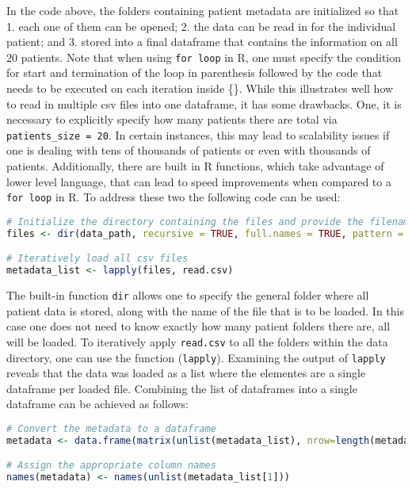In the code above, the folders containing patient metadata are initialized so that 1. each one of them can be opened; 2. the data can be read in for the individual patient; and 3. stored into a final dataframe that contains the information on all $20$ patients. Note that when using \verb|for loop| in R, one must specify the condition for start and termination of the loop in parenthesis followed by the code that needs to be executed on each iteration inside \{\}.
While this illustrates well how to read in multiple csv files into one dataframe, it has some drawbacks. One, it is necessary to explicitly specify how many patients there are total via \verb|patients_size = 20|. In certain instances, this may lead to scalability issues if one is dealing with tens of thousands of patients or even with thousands of patients. Additionally, there are built in R functions, which take advantage of lower level language, that can lead to speed improvements when compared to a \verb|for loop| in R.
To address these two the following code can be used:
\begin{lstlisting}[language=R]
# Initialize the directory containing the files and provide the filenames within each folder
files <- dir(data_path, recursive = TRUE, full.names = TRUE, pattern = "metadata.csv$")

# Iteratively load all csv files
metadata_list <- lapply(files, read.csv)
\end{lstlisting}
The built-in function \verb|dir| allows one to specify the general folder where all patient data is stored, along with the name of the file that is to be loaded. In this case one does not need to know exactly how many patient folders there are, all will be loaded. To iteratively apply \verb|read.csv| to all the folders within the data directory, one can use the function (\verb|lapply|).
Examining the output of \verb|lapply| reveals that the data was loaded as a list where the elementes are a single dataframe per loaded file. Combining the list of dataframes into a single dataframe can be achieved as follows:
\begin{lstlisting}[language=R]
# Convert the metadata to a dataframe
metadata <- data.frame(matrix(unlist(metadata_list), nrow=length(metadata_list), byrow=TRUE), stringsAsFactors=FALSE)

# Assign the appropriate column names
names(metadata) <- names(unlist(metadata_list[1]))
\end{lstlisting}

